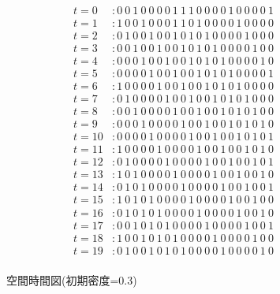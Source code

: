 \documentclass{jsarticle}
\begin{document}
\begin{figure}[htbp]
  \begin{align*}
    t = 0  & : 0 ~ 0 ~ 1 ~ 0 ~ 0 ~ 0 ~ 0 ~ 1 ~ 1 ~ 1 ~ 0 ~ 0 ~ 0 ~ 0 ~ 1 ~ 0 ~ 0 ~ 0 ~ 0 ~ 1 \\
    t = 1  & : 1 ~ 0 ~ 0 ~ 1 ~ 0 ~ 0 ~ 0 ~ 1 ~ 1 ~ 0 ~ 1 ~ 0 ~ 0 ~ 0 ~ 0 ~ 1 ~ 0 ~ 0 ~ 0 ~ 0 \\
    t = 2  & : 0 ~ 1 ~ 0 ~ 0 ~ 1 ~ 0 ~ 0 ~ 1 ~ 0 ~ 1 ~ 0 ~ 1 ~ 0 ~ 0 ~ 0 ~ 0 ~ 1 ~ 0 ~ 0 ~ 0 \\
    t = 3  & : 0 ~ 0 ~ 1 ~ 0 ~ 0 ~ 1 ~ 0 ~ 0 ~ 1 ~ 0 ~ 1 ~ 0 ~ 1 ~ 0 ~ 0 ~ 0 ~ 0 ~ 1 ~ 0 ~ 0 \\
    t = 4  & : 0 ~ 0 ~ 0 ~ 1 ~ 0 ~ 0 ~ 1 ~ 0 ~ 0 ~ 1 ~ 0 ~ 1 ~ 0 ~ 1 ~ 0 ~ 0 ~ 0 ~ 0 ~ 1 ~ 0 \\
    t = 5  & : 0 ~ 0 ~ 0 ~ 0 ~ 1 ~ 0 ~ 0 ~ 1 ~ 0 ~ 0 ~ 1 ~ 0 ~ 1 ~ 0 ~ 1 ~ 0 ~ 0 ~ 0 ~ 0 ~ 1 \\
    t = 6  & : 1 ~ 0 ~ 0 ~ 0 ~ 0 ~ 1 ~ 0 ~ 0 ~ 1 ~ 0 ~ 0 ~ 1 ~ 0 ~ 1 ~ 0 ~ 1 ~ 0 ~ 0 ~ 0 ~ 0 \\
    t = 7  & : 0 ~ 1 ~ 0 ~ 0 ~ 0 ~ 0 ~ 1 ~ 0 ~ 0 ~ 1 ~ 0 ~ 0 ~ 1 ~ 0 ~ 1 ~ 0 ~ 1 ~ 0 ~ 0 ~ 0 \\
    t = 8  & : 0 ~ 0 ~ 1 ~ 0 ~ 0 ~ 0 ~ 0 ~ 1 ~ 0 ~ 0 ~ 1 ~ 0 ~ 0 ~ 1 ~ 0 ~ 1 ~ 0 ~ 1 ~ 0 ~ 0 \\
    t = 9  & : 0 ~ 0 ~ 0 ~ 1 ~ 0 ~ 0 ~ 0 ~ 0 ~ 1 ~ 0 ~ 0 ~ 1 ~ 0 ~ 0 ~ 1 ~ 0 ~ 1 ~ 0 ~ 1 ~ 0 \\
    t = 10 & : 0 ~ 0 ~ 0 ~ 0 ~ 1 ~ 0 ~ 0 ~ 0 ~ 0 ~ 1 ~ 0 ~ 0 ~ 1 ~ 0 ~ 0 ~ 1 ~ 0 ~ 1 ~ 0 ~ 1 \\
    t = 11 & : 1 ~ 0 ~ 0 ~ 0 ~ 0 ~ 1 ~ 0 ~ 0 ~ 0 ~ 0 ~ 1 ~ 0 ~ 0 ~ 1 ~ 0 ~ 0 ~ 1 ~ 0 ~ 1 ~ 0 \\
    t = 12 & : 0 ~ 1 ~ 0 ~ 0 ~ 0 ~ 0 ~ 1 ~ 0 ~ 0 ~ 0 ~ 0 ~ 1 ~ 0 ~ 0 ~ 1 ~ 0 ~ 0 ~ 1 ~ 0 ~ 1 \\
    t = 13 & : 1 ~ 0 ~ 1 ~ 0 ~ 0 ~ 0 ~ 0 ~ 1 ~ 0 ~ 0 ~ 0 ~ 0 ~ 1 ~ 0 ~ 0 ~ 1 ~ 0 ~ 0 ~ 1 ~ 0 \\
    t = 14 & : 0 ~ 1 ~ 0 ~ 1 ~ 0 ~ 0 ~ 0 ~ 0 ~ 1 ~ 0 ~ 0 ~ 0 ~ 0 ~ 1 ~ 0 ~ 0 ~ 1 ~ 0 ~ 0 ~ 1 \\
    t = 15 & : 1 ~ 0 ~ 1 ~ 0 ~ 1 ~ 0 ~ 0 ~ 0 ~ 0 ~ 1 ~ 0 ~ 0 ~ 0 ~ 0 ~ 1 ~ 0 ~ 0 ~ 1 ~ 0 ~ 0 \\
    t = 16 & : 0 ~ 1 ~ 0 ~ 1 ~ 0 ~ 1 ~ 0 ~ 0 ~ 0 ~ 0 ~ 1 ~ 0 ~ 0 ~ 0 ~ 0 ~ 1 ~ 0 ~ 0 ~ 1 ~ 0 \\
    t = 17 & : 0 ~ 0 ~ 1 ~ 0 ~ 1 ~ 0 ~ 1 ~ 0 ~ 0 ~ 0 ~ 0 ~ 1 ~ 0 ~ 0 ~ 0 ~ 0 ~ 1 ~ 0 ~ 0 ~ 1 \\
    t = 18 & : 1 ~ 0 ~ 0 ~ 1 ~ 0 ~ 1 ~ 0 ~ 1 ~ 0 ~ 0 ~ 0 ~ 0 ~ 1 ~ 0 ~ 0 ~ 0 ~ 0 ~ 1 ~ 0 ~ 0 \\
    t = 19 & : 0 ~ 1 ~ 0 ~ 0 ~ 1 ~ 0 ~ 1 ~ 0 ~ 1 ~ 0 ~ 0 ~ 0 ~ 0 ~ 1 ~ 0 ~ 0 ~ 0 ~ 0 ~ 1 ~ 0 \\
  \end{align*}
  \caption{空間時間図(初期密度=0.3)}
  \label{fig:output1}
\end{figure}
\end{document}
